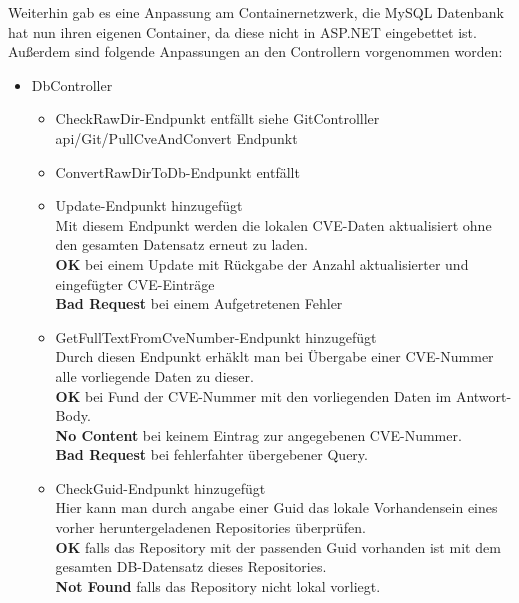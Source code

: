     \noindent Weiterhin gab es eine Anpassung am Containernetzwerk, die MySQL Datenbank hat nun ihren eigenen Container, da diese nicht in ASP.NET eingebettet ist.
    Außerdem sind folgende Anpassungen an den Controllern vorgenommen worden:
    \begin{itemize}
        \item DbController \label{api_controller:three}
            \begin{itemize}
                \item CheckRawDir-Endpunkt entfällt siehe GitControlller api/Git/PullCveAndConvert Endpunkt
                \item ConvertRawDirToDb-Endpunkt entfällt
                \item Update-Endpunkt hinzugefügt \\
                    Mit diesem Endpunkt werden die lokalen CVE-Daten aktualisiert ohne den gesamten Datensatz erneut zu laden.
                    \\
                    \textbf{OK} bei einem Update mit Rückgabe der Anzahl aktualisierter und eingefügter CVE-Einträge
                    \\
                    \textbf{Bad Request} bei einem Aufgetretenen Fehler
                \item GetFullTextFromCveNumber-Endpunkt hinzugefügt \\
                    Durch diesen Endpunkt erhäklt man bei Übergabe einer CVE-Nummer alle vorliegende Daten zu dieser.
                    \\
                    \textbf{OK} bei Fund der CVE-Nummer mit den vorliegenden Daten im Antwort-Body.
                    \\
                    \textbf{No Content} bei keinem Eintrag zur angegebenen CVE-Nummer. 
                    \\
                    \textbf{Bad Request} bei fehlerfahter übergebener Query.
                \item CheckGuid-Endpunkt hinzugefügt \\
                    Hier kann man durch angabe einer Guid das lokale Vorhandensein eines vorher heruntergeladenen Repositories überprüfen.
                    \\
                    \textbf{OK} falls das Repository mit der passenden Guid vorhanden ist mit dem gesamten DB-Datensatz dieses Repositories.
                    \\
                    \textbf{Not Found} falls das Repository nicht lokal vorliegt.
            \end{itemize}


\end{itemize}
